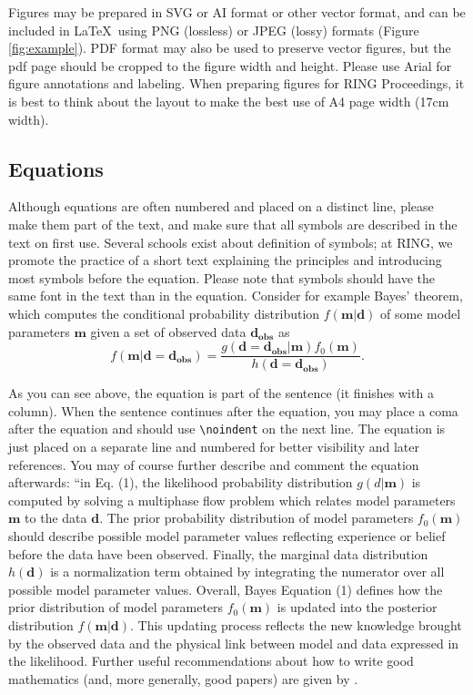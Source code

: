 \documentclass[final]{ring}
\begin{document}
Figures may be prepared in SVG or AI format or other vector format, and can be included in \LaTeX\ using PNG (lossless) or JPEG (lossy) formats (Figure \ref{fig:example}). PDF format may also be used to preserve vector figures, but the pdf page should be cropped to the figure width and height. Please use Arial for figure annotations and labeling. When preparing figures for RING Proceedings, it is best to think about the layout to make the best use of A4 page width (17cm width). 

\subsection{Equations}
Although equations are often numbered and placed on a distinct line, please make them part of the text, and make sure that all symbols are described in the text on first use. Several schools exist about definition of symbols; at RING, we promote the practice of a short text explaining the principles and introducing most symbols before the equation. Please note that symbols should have the same font in the text than in the equation. Consider for example Bayes’ theorem, which computes the conditional probability distribution $f(\mathbf{m}|\mathbf{d})$ of some model parameters $\mathbf{m}$ given a set of observed data $\mathbf{d_{obs}}$ as
\begin{equation}
f(\mathbf{m}| \mathbf{d} = \mathbf{d_{obs}} )=
    \frac{g( \mathbf{d} = \mathbf{d_{obs}} |\mathbf{m}) f_0(\mathbf{m})} 
    {h( \mathbf{d} = \mathbf{d_{obs}} )}.
\label{eq:Bayes}
\end{equation}

As you can see above, the equation is part of the sentence (it finishes with a column). When the sentence continues after the equation, you may place a coma after the equation and should use \verb|\noindent| on the next line. The equation is just placed on a separate line and numbered for better visibility and later references. You may of course further describe and comment the equation afterwards: “in Eq. (1), the likelihood probability distribution $g(d|\mathbf{m})$ is computed by solving a multiphase flow problem which relates model parameters $\mathbf{m}$ to the data $\mathbf{d}$. The prior probability distribution of model parameters $f_0 (\mathbf{m})$ should describe possible model parameter values reflecting experience or belief before the data have been observed. Finally, the marginal data distribution $h(\mathbf{d})$ is a normalization term obtained by integrating the numerator over all possible model parameter values. Overall, Bayes Equation (1) defines how the prior distribution of model parameters $f_0 (\mathbf{m})$ is updated into the posterior distribution $f(\mathbf{m}|\mathbf{d})$. This updating process reflects the new knowledge brought by the observed data and the physical link between model and data expressed in the likelihood. Further useful recommendations about how to write good mathematics (and, more generally, good papers) are given by \citet{Lee2010}.
\end{document}
